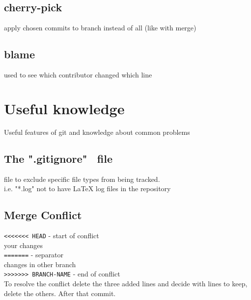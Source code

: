 \subsection*{cherry-pick}
apply chosen commits to branch instead of all (like with merge)\\

\subsection*{blame}
used to see which contributor changed which line \\


\section*{Useful knowledge}
Useful features of git and knowledge about common problems
\subsection*{The ".gitignore" \ file}
file to exclude specific file types from being tracked.\\
i.e. "*.log" not to have LaTeX log files in the repository\\

\subsection*{Merge Conflict}
\texttt{<{}<{}<{}<{}<{}<{}< HEAD} - start of conflict\\
your changes\\
\texttt{=======} - separator \\
changes in other branch \\
\texttt{>{}>{}>{}>{}>{}>{}> BRANCH-NAME} - end of conflict\\
To resolve the conflict delete the three added lines and decide with lines to keep, delete the others. After that commit.


